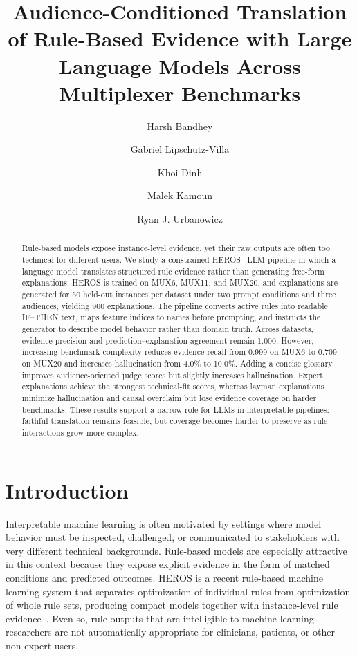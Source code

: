 \documentclass[sigconf,nonacm]{acmart}
\title{Audience-Conditioned Translation of Rule-Based Evidence with Large Language Models Across Multiplexer Benchmarks}
\author{Harsh Bandhey}
\affiliation{%
  \institution{Cedars Sinai Health Sciences University}
  \city{Los Angeles}
  \state{CA}
  \country{USA}
}
\author{Gabriel Lipschutz-Villa}
\affiliation{%
  \institution{University of Pennsylvania}
  \city{Philadelphia}
  \state{PA}
  \country{USA}
}
\author{Khoi Dinh}
\affiliation{%
  \institution{University of Pennsylvania}
  \city{Philadelphia}
  \state{PA}
  \country{USA}
}
\author{Malek Kamoun}
\affiliation{%
  \institution{University of Pennsylvania}
  \city{Philadelphia}
  \state{PA}
  \country{USA}
}
\author{Ryan J. Urbanowicz}
\affiliation{%
  \institution{Cedars Sinai Health Sciences University}
  \city{Los Angeles}
  \state{CA}
  \country{USA}
}
\begin{document}
\begin{abstract}
Rule-based models expose instance-level evidence, yet their raw outputs are often too technical for different users. We study a constrained HEROS+LLM pipeline in which a language model translates structured rule evidence rather than generating free-form explanations. HEROS is trained on MUX6, MUX11, and MUX20, and explanations are generated for 50 held-out instances per dataset under two prompt conditions and three audiences, yielding 900 explanations. The pipeline converts active rules into readable IF--THEN text, maps feature indices to names before prompting, and instructs the generator to describe model behavior rather than domain truth. Across datasets, evidence precision and prediction--explanation agreement remain 1.000. However, increasing benchmark complexity reduces evidence recall from 0.999 on MUX6 to 0.709 on MUX20 and increases hallucination from 4.0\% to 10.0\%. Adding a concise glossary improves audience-oriented judge scores but slightly increases hallucination. Expert explanations achieve the strongest technical-fit scores, whereas layman explanations minimize hallucination and causal overclaim but lose evidence coverage on harder benchmarks. These results support a narrow role for LLMs in interpretable pipelines: faithful translation remains feasible, but coverage becomes harder to preserve as rule interactions grow more complex.
\end{abstract}


\maketitle

\section{Introduction}
Interpretable machine learning is often motivated by settings where model behavior must be inspected, challenged, or communicated to stakeholders with very different technical backgrounds. Rule-based models are especially attractive in this context because they expose explicit evidence in the form of matched conditions and predicted outcomes. HEROS is a recent rule-based machine learning system that separates optimization of individual rules from optimization of whole rule sets, producing compact models together with instance-level rule evidence~\cite{lipschutzvilla2025heros}. Even so, rule outputs that are intelligible to machine learning researchers are not automatically appropriate for clinicians, patients, or other non-expert users.
\end{document}
